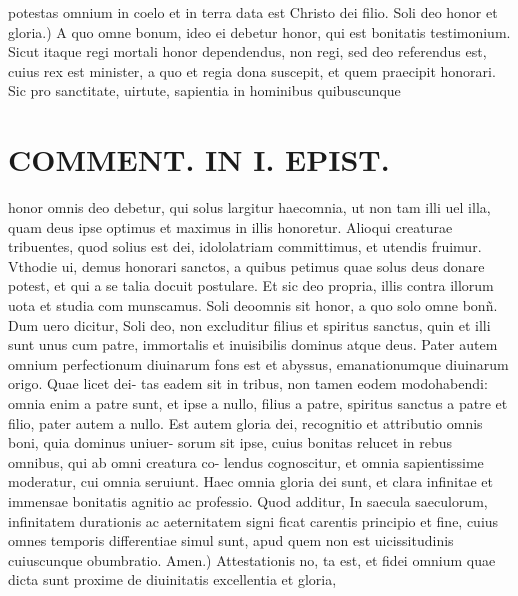 \documentclass{article}
\begin{document}
\begin{pages}
potestas omnium in coelo et in terra data est Christo dei filio. Soli deo honor et gloria.) A quo omne bonum, ideo ei debetur honor, qui est bonitatis testimonium. Sicut itaque regi mortali honor dependendus, non regi, sed deo referendus est, cuius rex est minister, a quo et regia dona suscepit, et quem praecipit honorari. Sic pro sanctitate, uirtute, sapientia in hominibus quibuscunque   \pend
\section*{COMMENT. IN I. EPIST. }
\marginpar{[ p.478 ]}\pstart honor omnis deo debetur, qui solus largitur haecomnia, ut non tam illi uel illa, quam deus ipse optimus et maximus in illis honoretur. Alioqui creaturae tribuentes, quod solius est dei, idololatriam committimus, et utendis fruimur. Vthodie ui, demus honorari sanctos, a quibus petimus quae solus deus donare potest, et qui a se talia docuit postulare. Et sic deo propria, illis contra illorum uota et studia com munscamus. Soli deoomnis sit honor, a quo solo omne bonñ. Dum uero dicitur, Soli deo, non excluditur filius et spiritus sanctus, quin et illi sunt unus cum patre, immortalis et inuisibilis dominus atque deus. Pater autem omnium perfectionum diuinarum fons est et abyssus, emanationumque diuinarum origo. Quae licet dei- tas eadem sit in tribus, non tamen eodem modohabendi: omnia enim a patre sunt, et ipse a nullo, filius a patre, spiritus sanctus a patre et filio, pater autem a nullo. Est autem gloria dei, recognitio et attributio omnis boni, quia dominus uniuer- sorum sit ipse, cuius bonitas relucet in rebus omnibus, qui ab omni creatura co- lendus cognoscitur, et omnia sapientissime moderatur, cui omnia seruiunt. Haec omnia gloria dei sunt, et clara infinitae et immensae bonitatis agnitio ac professio. Quod additur, In saecula saeculorum, infinitatem durationis ac aeternitatem signi ficat carentis principio et fine, cuius omnes temporis differentiae simul sunt, apud quem non est uicissitudinis cuiuscunque obumbratio. Amen.) Attestationis no, ta est, et fidei omnium quae dicta sunt proxime de diuinitatis excellentia et gloria,  \pend
{}
{}

\end{pages}
\end{document}
